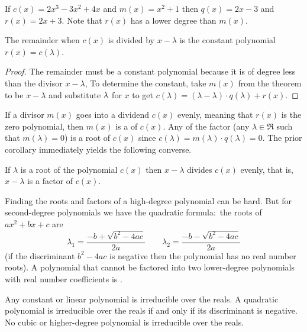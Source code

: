 \begin{example}
If \( c(x)=2x^3-3x^2+4x \) and \( m(x)=x^2+1 \) then \( q(x)=2x-3 \) and
\( r(x)=2x+3 \).
Note that \( r(x) \) has a lower degree than \( m(x) \).
\end{example}

\begin{corollary}
The remainder when \( c(x) \) is divided by \( x-\lambda \) is the constant
polynomial \( r(x)=c(\lambda) \).
\end{corollary}

\begin{proof}
The remainder must be a constant polynomial
because it is of degree less than the divisor \( x-\lambda \), 
To determine the constant,
take $m(x)$ from the theorem to be $x-\lambda$ and 
substitute \( \lambda\/ \) for $x$ to get
\( c(\lambda)=(\lambda-\lambda)\cdot q(\lambda)+r(x) \). 
\end{proof}

If a divisor \( m(x) \) goes into a dividend \( c(x) \) evenly,
meaning that \( r(x) \) is the zero polynomial,
then \( m(x) \) is a  of \( c(x) \).
Any  of the factor (any \( \lambda\in\Re \) such that
\( m(\lambda)=0 \)) is a root of \( c(x) \) since
\( c(\lambda)=m(\lambda)\cdot q(\lambda)=0 \).
The prior corollary immediately yields the following converse.

\begin{corollary}
If \( \lambda \) is a root of the polynomial \( c(x) \)
then \( x-\lambda \) divides \( c(x) \) evenly, that is, 
$x-\lambda$ is a factor of $c(x)$.
\end{corollary}

Finding the roots and factors of a high-degree polynomial can be hard.
But for second-degree polynomials we have the quadratic formula:~the
roots of \( ax^2+bx+c \) are
\begin{equation*}
   \lambda_1=\frac{-b+\sqrt{b^2-4ac}}{2a}
   \qquad
   \lambda_2=\frac{-b-\sqrt{b^2-4ac}}{2a}
\end{equation*}
(if the discriminant \( b^2-4ac \) is negative then the polynomial
has no real number roots).
A polynomial that cannot be factored into two lower-degree polynomials
with real number coefficients is .

\begin{theorem}
Any constant or linear polynomial is irreducible over the reals.
A quadratic polynomial is irreducible over the reals if and only if its
discriminant is negative.
No cubic or higher-degree polynomial is irreducible over the reals.
\end{theorem}

